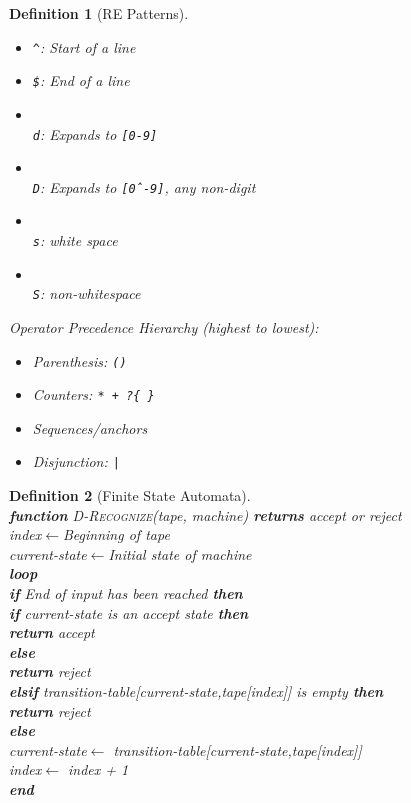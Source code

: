 \documentclass[12pt]{article}
\newcommand{\ind}{\hspace*{15pt}}
\newtheorem{definition}{Definition}[section]
\theoremstyle{definition}
\begin{document}
\begin{definition}[RE Patterns]
\begin{itemize}
	\item \texttt{\^}: Start of a line
	\item \texttt{\$}: End of a line
	\item \texttt{\\d}: Expands to \texttt{[0-9]}
	\item \texttt{\\D}: Expands to \texttt{[\^0-9]}, any non-digit
	\item \texttt{\\s}: white space
	\item \texttt{\\S}: non-whitespace
\end{itemize}
Operator Precedence Hierarchy (highest to lowest):
\begin{itemize}
	\item Parenthesis: \texttt{()}
	\item Counters: \texttt{* + ?\{ \}}
	\item Sequences/anchors
	\item Disjunction: \texttt{|}
\end{itemize}
\end{definition}
\begin{definition}[Finite State Automata]
\hfill\\\normalfont \textbf{function} \textsc{D-Recognize}(\textit{tape}, \textit{machine}) \textbf{returns} accept or reject\\
\ind \textit{index}$\leftarrow$Beginning of tape\\
\ind \textit{current-state}$\leftarrow$Initial state of machine\\
\ind \textbf{loop}\\
\ind \ind \textbf{if} End of input has been reached \textbf{then}\\
\ind \ind \ind \textbf{if} current-state is an accept state \textbf{then}\\
\ind \ind \ind \ind \textbf{return} accept\\
\ind \ind \ind \textbf{else}\\
\ind \ind \ind \ind \textbf{return} reject\\
\ind \ind \textbf{elsif} \textit{transition-table}[\textit{current-state},\textit{tape}[\textit{index}]] is empty \textbf{then}\\
\ind \ind \ind \textbf{return} reject\\
\ind \ind \textbf{else}\\
\ind \ind \ind \textit{current-state}$\leftarrow$ \textit{transition-table}[\textit{current-state},\textit{tape}[\textit{index}]]\\
\ind \ind \ind \textit{index}$\leftarrow$ \textit{index} + 1\\
\textbf{end}
\end{definition}
\end{document}

